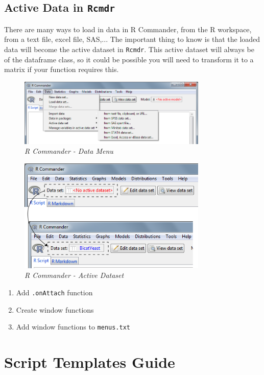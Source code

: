 \documentclass[a4paper]{article}\usepackage[]{graphicx}\usepackage[]{color}
\begin{document}
\subsection{Active Data in \texttt{Rcmdr}}
There are many ways to load in data in R Commander, from the R workspace, from a
text file, excel file, SAS,... The important thing to know is that the loaded
data will become the active dataset in \texttt{Rcmdr}. This active dataset will
always be of the dataframe class, so it could be possible you will need to
transform it to a matrix if your function requires this.

\begin{figure}[H]
\centering
\includegraphics[width=9cm]{figures/rcmdr_datainput.png}
\caption{{\it R Commander - Data Menu}\label{datainput}}
\end{figure}
\begin{figure}[H]
\centering
\includegraphics[width=9cm]{figures/rcmdr_activedataset.png}
\caption{{\it R Commander - Active Dataset}\label{activedataset}}
\end{figure}

\begin{enumerate}
  \item Add \texttt{.onAttach} function
  \item Create window functions
  \item Add window functions to \texttt{menus.txt}
\end{enumerate}

\section{Script Templates Guide}
\end{document}
